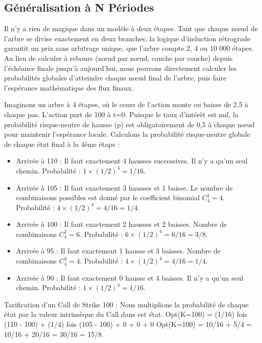 \subsection{Généralisation à N Périodes}

\begin{intuitionbox}
Il n'y a rien de magique dans un modèle à deux étapes. Tant que chaque nœud de l'arbre se divise exactement en deux branches, la logique d'induction rétrograde garantit un prix sans arbitrage unique, que l'arbre compte 2, 4 ou 10 000 étapes.
Au lieu de calculer à rebours (nœud par nœud, couche par couche) depuis l'échéance finale jusqu'à aujourd'hui, nous pouvons directement calculer les probabilités globales d'atteindre chaque nœud final de l'arbre, puis faire l'espérance mathématique des flux finaux.
\end{intuitionbox}

\newpage

\begin{examplebox}[Exemple d'un arbre à 4 pas de temps (Taux d'intérêt = 0)]
Imaginons un arbre à 4 étapes, où le cours de l'action monte ou baisse de 2,5 à chaque pas. L'action part de 100 à t=0. 
Puisque le taux d'intérêt est nul, la probabilité risque-neutre de hausse (p) est obligatoirement de 0,5 à chaque nœud pour maintenir l'espérance locale.
Calculons la probabilité risque-neutre globale de chaque état final à la 4ème étape :

\begin{itemize}[label=$\cdot$]
    \item Arrivée à 110 : Il faut exactement 4 hausses successives.
    Il n'y a qu'un seul chemin. Probabilité : $1 \times (1/2)^4 = 1/16$.
    
    \item Arrivée à 105 : Il faut exactement 3 hausses et 1 baisse.
    Le nombre de combinaisons possibles est donné par le coefficient binomial $C_4^1 = 4$.
    Probabilité : $4 \times (1/2)^4 = 4/16 = 1/4$.
    
    \item Arrivée à 100 : Il faut exactement 2 hausses et 2 baisses.
    Nombre de combinaisons $C_4^2 = 6$.
    Probabilité : $6 \times (1/2)^4 = 6/16 = 3/8$.
    
    \item Arrivée à 95 : Il faut exactement 1 hausse et 3 baisses.
    Nombre de combinaisons $C_4^3 = 4$.
    Probabilité : $4 \times (1/2)^4 = 4/16 = 1/4$.
    
    \item Arrivée à 90 : Il faut exactement 0 hausse et 4 baisses.
    Il n'y a qu'un seul chemin. Probabilité : $1 \times (1/2)^4 = 1/16$.
\end{itemize}

Tarification d'un Call de Strike 100 :
Nous multiplions la probabilité de chaque état par la valeur intrinsèque du Call dans cet état.
Opt(K=100) = (1/16) fois (110 - 100) + (1/4) fois (105 - 100) + 0 + 0 + 0
Opt(K=100) = 10/16 + 5/4 = 10/16 + 20/16 = 30/16 = 15/8.
\end{examplebox}


